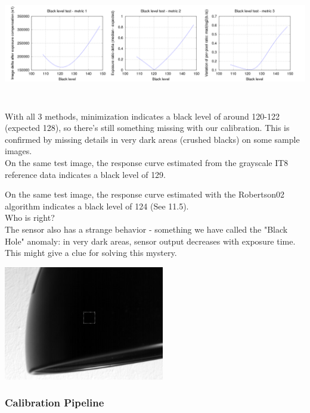 \begin{center}
\includegraphics[height=5cm]{images/black_check}
\end{center}

With all 3 methods, minimization indicates a black level of around 120-122 (expected 128), so there's still something missing with our calibration. This is confirmed by missing details in very dark areas (crushed blacks) on some sample images.\\ 

On the same test image, the response curve estimated from the grayscale IT8 reference data indicates a black level of 129. 

On the same test image, the response curve estimated with the Robertson02 algorithm indicates a black level of 124 (See 11.5).\\

Who is right?\\

The sensor also has a strange behavior - something we have called the "Black Hole" anomaly: in very dark areas, sensor output decreases with exposure time. This might give a clue for solving this mystery.\\

\begin{center}
\includegraphics[height=5cm]{images/blackhole}
\end{center}





\subsubsection{Calibration Pipeline}

